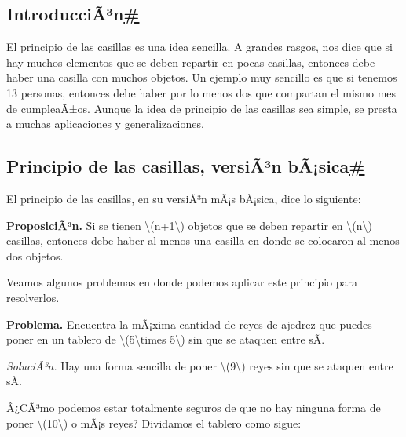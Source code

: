 \documentclass[
]{article}
\makeatletter
\newcommand*\pandocbounded[1]{%
  \sbox\pandoc@box{#1}%
  \Gscale@div\@tempa{\textheight}{\dimexpr\ht\pandoc@box+\dp\pandoc@box\relax}%
  \Gscale@div\@tempb{\linewidth}{\wd\pandoc@box}%
  \ifdim\@tempb\p@<\@tempa\p@\let\@tempa\@tempb\fi%
  \ifdim\@tempa\p@<\p@\scalebox{\@tempa}{\usebox\pandoc@box}%
  \else\usebox{\pandoc@box}%
  \fi%
}
\makeatother
\begin{document}
\label{introduccion}
\subsection{\texorpdfstring{IntroducciÃ³n\hyperref[introduccion]{\#}}{IntroducciÃ³n\#}}\label{introducciuxe3uxb3n}

El principio de las casillas es una idea sencilla. A grandes rasgos, nos
dice que si hay muchos elementos que se deben repartir en pocas
casillas, entonces debe haber una casilla con muchos objetos. Un ejemplo
muy sencillo es que si tenemos 13 personas, entonces debe haber por lo
menos dos que compartan el mismo mes de cumpleaÃ±os. Aunque la idea de
principio de las casillas sea simple, se presta a muchas aplicaciones y
generalizaciones.

\label{principio-de-las-casillas-version-basica}
\subsection{\texorpdfstring{Principio de las casillas, versiÃ³n
bÃ¡sica\hyperref[principio-de-las-casillas-version-basica]{\#}}{Principio de las casillas, versiÃ³n bÃ¡sica\#}}\label{principio-de-las-casillas-versiuxe3uxb3n-buxe3sica}

El principio de las casillas, en su versiÃ³n mÃ¡s bÃ¡sica, dice lo
siguiente:

\textbf{ProposiciÃ³n.} Si se tienen {\textbackslash(n+1\textbackslash)}
objetos que se deben repartir en {\textbackslash(n\textbackslash)}
casillas, entonces debe haber al menos una casilla en donde se colocaron
al menos dos objetos.

Veamos algunos problemas en donde podemos aplicar este principio para
resolverlos.

\textbf{Problema.} Encuentra la mÃ¡xima cantidad de reyes de ajedrez que
puedes poner en un tablero de {\textbackslash(5\textbackslash times
5\textbackslash)} sin que se ataquen entre sÃ­.

\emph{SoluciÃ³n.} Hay una forma sencilla de poner
{\textbackslash(9\textbackslash)} reyes sin que se ataquen entre sÃ­.

\pandocbounded{}

Â¿CÃ³mo podemos estar totalmente seguros de que no hay ninguna forma de
poner {\textbackslash(10\textbackslash)} o mÃ¡s reyes? Dividamos el
tablero como sigue:

\pandocbounded{}
\end{document}
